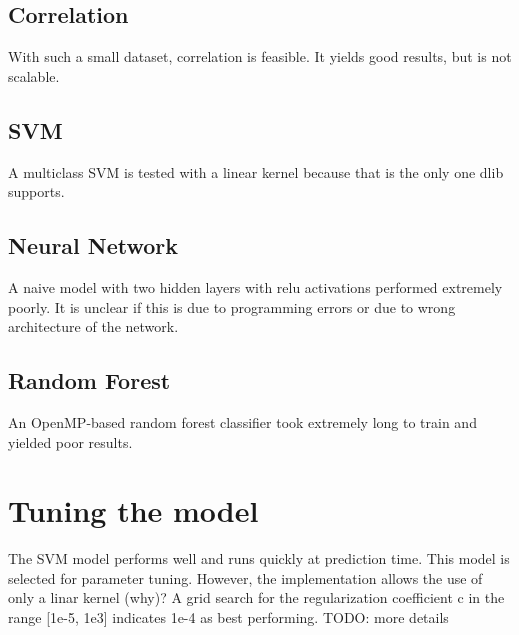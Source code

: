 \documentclass{article}
\begin{document}
\subsection{Correlation}
With such a small dataset, correlation is feasible.
It yields good results, but is not scalable.


\subsection{SVM}
A multiclass SVM is tested with a linear kernel because that is the only one dlib supports.



\subsection{Neural Network}
A naive model with two hidden layers with relu activations performed extremely poorly.
It is unclear if this is due to programming errors or due to wrong architecture of the network.


\subsection{Random Forest}
An OpenMP-based random forest classifier took extremely long to train and yielded poor results.


\section{Tuning the model}
The SVM model performs well and runs quickly at prediction time.
This model is selected for parameter tuning.
However, the implementation allows the use of only a linar kernel (why)?
A grid search for the regularization coefficient c in the range [1e-5, 1e3] indicates 1e-4 as best performing.
TODO: more details
\end{document}
